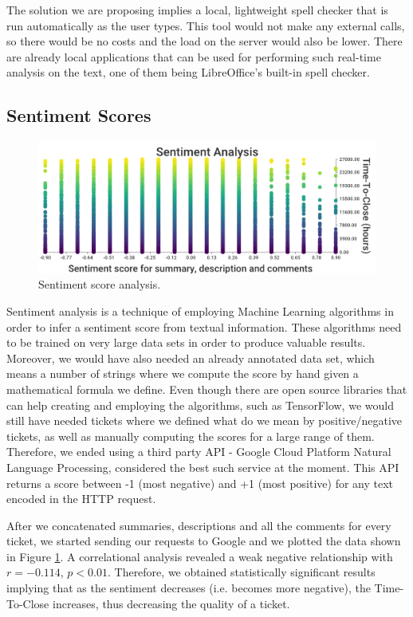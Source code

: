 \documentclass{mpaper}
\begin{document}
The solution we are proposing implies a local, lightweight spell checker that is run automatically as the user types. 
This tool would not make any external calls, so there would be no costs and the load on the server would also be lower. 
There are already local applications that can be used for performing such real-time analysis on the text, one of them 
being LibreOffice's built-in spell checker.

\subsection{Sentiment Scores}

\begin{figure}[ht]
  \begin{center}
    \includegraphics[scale=0.25]{images/sentiment_analysis.png}
  \end{center}
  \caption{\label{sentiment}Sentiment score analysis.}
\end{figure}

Sentiment analysis is a technique of employing Machine Learning algorithms in order to infer a sentiment 
score from textual information. These algorithms need to be trained on very large data sets in order to 
produce valuable results. Moreover, we would have also needed an already annotated data set, which means 
a number of strings where we compute the score by hand given a mathematical formula we define. Even though 
there are open source libraries that can help creating and employing the algorithms, such as TensorFlow, 
we would still have needed tickets where we defined what do we mean by positive/negative tickets, as well as
manually computing the scores for a large range of them. Therefore, we ended using a third party API - Google 
Cloud Platform Natural Language Processing, considered the best such service at the moment. This API returns 
a score between -1 (most negative) and +1 (most positive) for any text encoded in the HTTP request.

After we concatenated summaries, descriptions and all the comments for every ticket, we started sending our 
requests to Google and we plotted the data shown in Figure \ref{sentiment}. A correlational analysis revealed a 
weak negative relationship with $r = -0.114$, $p < 0.01$. Therefore, we obtained statistically significant 
results implying that as the sentiment decreases (i.e. becomes more negative), the Time-To-Close increases, thus 
decreasing the quality of a ticket.
\end{document}
